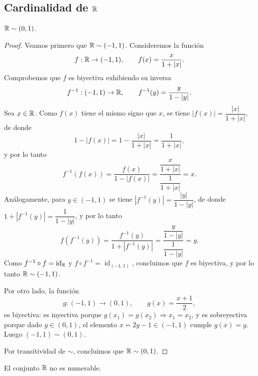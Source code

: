 \subsection{Cardinalidad de $\mathbb{R}$}

\begin{prop}
$\mathbb{R} \sim (0,1)$.
\end{prop}

\begin{proof}
Veamos primero que $\mathbb{R} \sim (-1,1)$. Consideremos la función
\[
f : \mathbb{R} \to (-1,1), \qquad f(x) = \frac{x}{1+|x|}.
\]
Comprobemos que $f$ es biyectiva exhibiendo su inversa
\[
f^{-1} : (-1,1) \to \mathbb{R}, \qquad f^{-1}(y) = \frac{y}{1-|y|}.
\]
Sea $x \in \mathbb{R}$. Como $f(x)$ tiene el mismo signo que $x$, se tiene
$|f(x)| = \dfrac{|x|}{1+|x|}$, de donde
\[
1 - |f(x)| = 1 - \frac{|x|}{1+|x|} = \frac{1}{1+|x|},
\]
y por lo tanto
\[
f^{-1}(f(x)) = \frac{f(x)}{1-|f(x)|}
= \frac{\dfrac{x}{1+|x|}}{\dfrac{1}{1+|x|}} = x.
\]
Análogamente, para $y \in (-1,1)$ se tiene $|f^{-1}(y)| = \dfrac{|y|}{1-|y|}$,
de donde $1+|f^{-1}(y)| = \dfrac{1}{1-|y|}$, y por lo tanto
\[
f(f^{-1}(y)) = \frac{f^{-1}(y)}{1+|f^{-1}(y)|}
= \frac{\dfrac{y}{1-|y|}}{\dfrac{1}{1-|y|}} = y.
\]
Como $f^{-1}\circ f = \operatorname{id}_{\mathbb{R}}$ y $f\circ f^{-1} = \operatorname{id}_{(-1,1)}$,
concluimos que $f$ es biyectiva, y por lo tanto $\mathbb{R} \sim (-1,1)$.

Por otro lado, la función
\[
g : (-1,1) \to (0,1), \qquad g(x) = \frac{x+1}{2},
\]
es biyectiva: es inyectiva porque $g(x_1)=g(x_2) \Rightarrow x_1=x_2$, y es
sobreyectiva porque dado $y \in (0,1)$, el elemento $x = 2y-1 \in (-1,1)$
cumple $g(x)=y$. Luego $(-1,1) \sim (0,1)$.

Por transitividad de $\sim$, concluimos que $\mathbb{R} \sim (0,1)$.
\end{proof}

\begin{teo}
El conjunto $\mathbb{R}$ no es numerable.
\end{teo}

